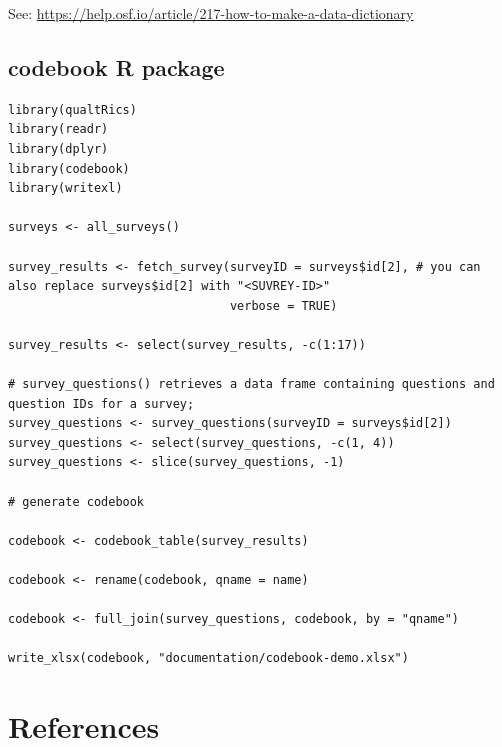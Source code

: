 \documentclass[
  letterpaper,
  DIV=11,
  numbers=noendperiod]{scrreprt}
\newlength{\cslhangindent}
\newlength{\cslentryspacingunit} %
\newenvironment{CSLReferences}[2] %
 {%
  \setlength{\parindent}{0pt}
  \ifodd #1
  \let\oldpar\par
  \def\par{\hangindent=\cslhangindent\oldpar}
  \fi
  \setlength{\parskip}{#2\cslentryspacingunit}
 }%
 {}
\begin{document}
See: \url{https://help.osf.io/article/217-how-to-make-a-data-dictionary}

\hypertarget{codebook-r-package}{%
\section*{codebook R package}\label{codebook-r-package}}


\begin{verbatim}
library(qualtRics)
library(readr)
library(dplyr)
library(codebook)
library(writexl)

surveys <- all_surveys()

survey_results <- fetch_survey(surveyID = surveys$id[2], # you can also replace surveys$id[2] with "<SUVREY-ID>"
                               verbose = TRUE)

survey_results <- select(survey_results, -c(1:17))

# survey_questions() retrieves a data frame containing questions and question IDs for a survey;
survey_questions <- survey_questions(surveyID = surveys$id[2])
survey_questions <- select(survey_questions, -c(1, 4))
survey_questions <- slice(survey_questions, -1)
  
# generate codebook

codebook <- codebook_table(survey_results)

codebook <- rename(codebook, qname = name)

codebook <- full_join(survey_questions, codebook, by = "qname")

write_xlsx(codebook, "documentation/codebook-demo.xlsx")
\end{verbatim}


\hypertarget{references-2}{%
\chapter*{References}\label{references-2}}


\hypertarget{refs}{}
\begin{CSLReferences}{0}{0}
\end{CSLReferences}
\end{document}
